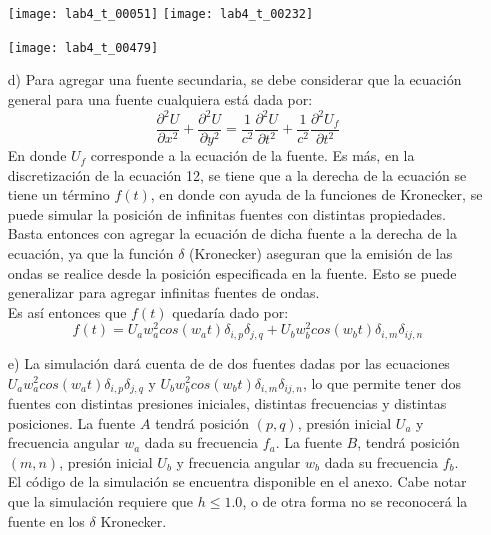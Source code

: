 \documentclass[letterpaper]{article}
\newcommand{\5}
{
\\[.5cm]
}
\begin{document}
\begin{itemize}
	\begin{center}
  		\centerline{%
  			\texttt{[image: lab4\_t\_00051]}%
  			\texttt{[image: lab4\_t\_00232]}%
    	}%
        \centerline{%
        	\texttt{[image: lab4\_t\_00479]}%
        }%
   \end{center}
   \item[d)] Para agregar una fuente secundaria, se debe considerar que la ecuación general para una fuente cualquiera está dada por: \\
   \begin{equation}
   	\frac{\partial^2 U}{\partial x^2} + \frac{\partial^2 U}{\partial y^2} = \frac{1}{c^2}\frac{\partial^2 U}{\partial t^2} + \frac{1}{c^2} \frac{\partial^2 U_f}{\partial t^2}
   \end{equation}
   En donde $U_f$ corresponde a la ecuación de la fuente. Es más, en la discretización de la ecuación 12, se tiene que a la derecha de la ecuación se tiene un término $f(t)$, en donde con ayuda de la funciones de Kronecker, se puede simular la posición de infinitas fuentes con distintas propiedades. \\[0.2cm]
   Basta entonces con agregar la ecuación de dicha fuente a la derecha de la ecuación, ya que la función $\delta$ (Kronecker) aseguran que la emisión de las ondas se realice desde la posición especificada en la fuente. Esto se puede generalizar para agregar infinitas fuentes de ondas.\\[0.2cm]
   Es así entonces que $f(t)$ quedaría dado por:
   \begin{equation}
   		f(t) = U_{a} w_a^2 cos(w_at)\delta_{i,p} \delta_{j,q} + U_{b} w_b^2 cos(w_bt) \delta_{i, m} \delta_{ij, n}
	\end{equation}   
   \item[e)] La simulación dará cuenta de de dos fuentes dadas por las ecuaciones $U_{a} w_a^2 cos(w_at)\delta_{i,p} \delta_{j,q}$ y $U_{b} w_b^2 cos(w_bt) \delta_{i, m} \delta_{ij, n}$, lo que permite tener dos fuentes con distintas presiones iniciales, distintas frecuencias y distintas posiciones. La fuente $A$ tendrá posición $(p, q)$, presión inicial $U_a$ y frecuencia angular $w_a$ dada su frecuencia $f_a$. La fuente $B$, tendrá posición $(m, n)$, presión inicial $U_b$ y frecuencia angular $w_b$ dada su frecuencia $f_b$. \\[0.2cm]
   El código de la simulación se encuentra disponible en el anexo. Cabe notar que la simulación requiere que $h \leq 1.0$, o de otra forma no se reconocerá la fuente en los $\delta$ Kronecker.
\end{itemize}
\end{document}
